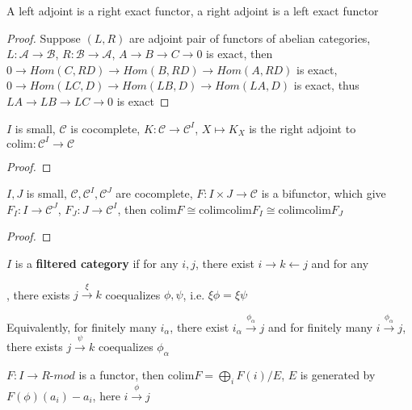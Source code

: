 \documentclass[../main.tex]{subfiles}
\begin{document}
\begin{lemma}
A left adjoint is a right exact functor, a right adjoint is a left exact functor
\end{lemma}

\begin{proof}
Suppose $(L,R)$ are adjoint pair of functors of abelian categories, $L:\mathscr A\to\mathscr B$, $R:\mathscr B\to\mathscr A$, $A\to B\to C\to0$ is exact, then $0\to Hom(C,RD)\to Hom(B,RD)\to Hom(A,RD)$ is exact, $0\to Hom(LC,D)\to Hom(LB,D)\to Hom(LA,D)$ is exact, thus $LA\to LB\to LC\to0$ is exact
\end{proof}

\begin{proposition}
$I$ is small, $\mathscr C$ is cocomplete, $K:\mathscr C\to\mathscr C^I$, $X\mapsto K_X$ is the right adjoint to $\mathrm{colim}:\mathscr C^I\to\mathscr C$
\end{proposition}

\begin{proof}

\end{proof}

\begin{corollary}
$I,J$ is small, $\mathscr C,\mathscr C^I,\mathscr C^J$ are cocomplete, $F:I\times J\to \mathscr C$ is a bifunctor, which give $F_I:I\to\mathscr C^J$, $F_J:J\to\mathscr C^I$, then $\mathrm{colim}F\cong\mathrm{colim}\mathrm{colim}F_I\cong\mathrm{colim}\mathrm{colim}F_J$
\end{corollary}

\begin{proof}

\end{proof}

\begin{definition}
$I$ is a \textbf{filtered category} if for any $i,j$, there exist $i\to k\leftarrow j$ and for any , there exists $j\xrightarrow{\xi}k$ coequalizes $\phi,\psi$, i.e. $\xi\phi=\xi\psi$ \par
Equivalently, for finitely many $i_\alpha$, there exist $i_\alpha\xrightarrow{\phi_\alpha}j$ and for finitely many $i\xrightarrow{\phi_\alpha}j$, there exists $j\xrightarrow{\psi}k$ coequalizes $\phi_\alpha$
\end{definition}

\begin{lemma}
$F:I\to R$-$mod$ is a functor, then $\mathrm{colim}F=\bigoplus_{i}F(i)/E$, $E$ is generated by $F(\phi)(a_i)-a_i$, here $i\xrightarrow{\phi}j$
\end{lemma}
\end{document}
